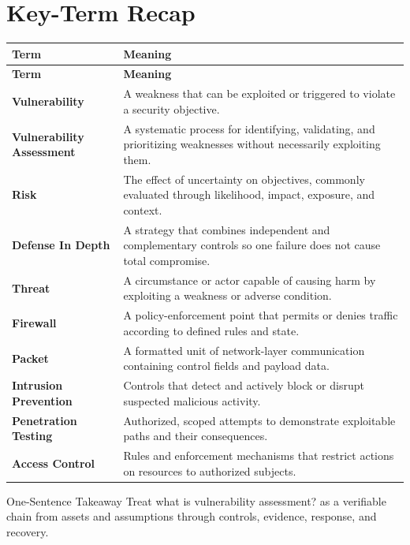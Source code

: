 \documentclass[11pt,letterpaper]{article}
\begin{document}
\section*{Key-Term Recap}
\begin{longtable}{>{\raggedright\arraybackslash}p{}>{\raggedright\arraybackslash}p{}}
\toprule\rowcolor{Navy}\color{white}\textbf{Term} & \color{white}\textbf{Meaning}\\\midrule
\endfirsthead
\toprule\rowcolor{Navy}\color{white}\textbf{Term} & \color{white}\textbf{Meaning}\\\midrule
\endhead
\textbf{Vulnerability} & A weakness that can be exploited or triggered to violate a security objective. \\\midrule
\textbf{Vulnerability Assessment} & A systematic process for identifying, validating, and prioritizing weaknesses without necessarily exploiting them. \\\midrule
\textbf{Risk} & The effect of uncertainty on objectives, commonly evaluated through likelihood, impact, exposure, and context. \\\midrule
\textbf{Defense In Depth} & A strategy that combines independent and complementary controls so one failure does not cause total compromise. \\\midrule
\textbf{Threat} & A circumstance or actor capable of causing harm by exploiting a weakness or adverse condition. \\\midrule
\textbf{Firewall} & A policy-enforcement point that permits or denies traffic according to defined rules and state. \\\midrule
\textbf{Packet} & A formatted unit of network-layer communication containing control fields and payload data. \\\midrule
\textbf{Intrusion Prevention} & Controls that detect and actively block or disrupt suspected malicious activity. \\\midrule
\textbf{Penetration Testing} & Authorized, scoped attempts to demonstrate exploitable paths and their consequences. \\\midrule
\textbf{Access Control} & Rules and enforcement mechanisms that restrict actions on resources to authorized subjects. \\\midrule
\bottomrule
\end{longtable}
\begin{CornellExamBox}{One-Sentence Takeaway}
Treat what is vulnerability assessment? as a verifiable chain from assets and assumptions through controls, evidence, response, and recovery.
\end{CornellExamBox}
\end{document}
